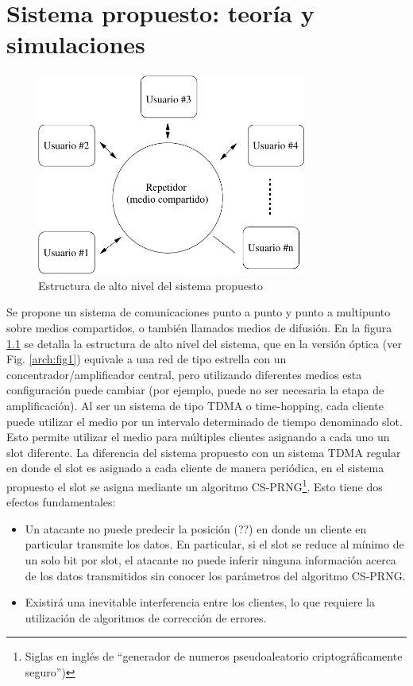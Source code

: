 \chapter{Sistema propuesto: teoría y simulaciones}

\begin{figure}[t]
\centering
\includegraphics[width=3.5in]{graphs/hub}
\caption{Estructura de alto nivel del sistema propuesto}
\label{fig_hub}
\end{figure}

Se propone un sistema de comunicaciones punto a punto y punto a multipunto sobre medios compartidos, o también llamados medios de difusión. En la figura \ref{fig_hub} se detalla la estructura de alto nivel del sistema, que en la versión óptica (ver Fig. \ref{arch:fig1}) equivale a una red de tipo estrella con un concentrador/amplificador central, pero utilizando diferentes medios esta configuración puede cambiar (por ejemplo, puede no ser necesaria la etapa de amplificación).
Al ser un sistema de tipo TDMA o time-hopping, cada cliente puede utilizar el medio por un intervalo determinado de tiempo denominado slot. Esto permite utilizar el medio para múltiples clientes asignando a cada uno un slot diferente. La diferencia del sistema propuesto con un sistema TDMA regular en donde el slot es asignado a cada cliente de manera periódica, en el sistema propuesto el slot se asigna mediante un algoritmo CS-PRNG\footnote{Siglas en inglés de ``generador de numeros pseudoaleatorio criptográficamente seguro'')}. Esto tiene dos efectos fundamentales: 

\begin{itemize}
 \item Un atacante no puede predecir la posición (??) en donde un cliente en particular transmite los datos. En particular, si el slot se reduce al mínimo de un solo bit por slot, el atacante no puede inferir ninguna información acerca de los datos transmitidos sin conocer los parámetros del algoritmo CS-PRNG.
 \item Existirá una inevitable interferencia entre los clientes, lo que requiere la utilización de algoritmos de corrección de errores.
\end{itemize}

